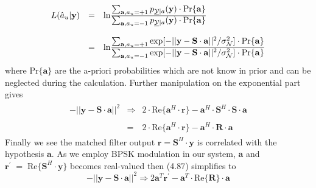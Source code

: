 \begin{eqnarray}
\begin{array}{lll}
L(\hat{a}_u\vert \mathrm{\mathbf{y}})&=&
\mathrm{ln}
\frac
{\hbox{$\sum_{\mathrm{\mathbf{a}},a_u=+1}p_{\underline{\mathcal{Y}}\vert a}(\mathrm{\mathbf{y}})\cdot \mathrm{Pr}\{\mathrm{\mathbf{a}}\}$}}
{\hbox{$\sum_{\mathrm{\mathbf{a}},a_u=-1}p_{\underline{\mathcal{Y}}\vert a}(\mathrm{\mathbf{y}})\cdot \mathrm{Pr}\{\mathrm{\mathbf{a}}\}$}} \\ \\
&=&
\mathrm{ln}
\frac
{\hbox{$\sum_{\mathrm{\mathbf{a}},a_u=+1}\mathrm{exp}[-\vert\vert \mathrm{\mathbf{y}}-\mathrm{\mathbf{S}}\cdot \mathrm{\mathbf{a}}\vert \vert ^2 / \sigma^2_{\mathcal{N}}]\cdot \mathrm{Pr}\{\mathrm{\mathbf{a}}\}$}}
{\hbox{$\sum_{\mathrm{\mathbf{a}},a_u=-1}\mathrm{exp}[-\vert\vert \mathrm{\mathbf{y}}-\mathrm{\mathbf{S}}\cdot \mathrm{\mathbf{a}}\vert \vert ^2 / \sigma^2_{\mathcal{N}}]\cdot \mathrm{Pr}\{\mathrm{\mathbf{a}}\}$}}
\end{array}
\end{eqnarray}
where $\mathrm{Pr}\{\mathrm{\mathbf{a}}\}$ are the a-priori probabilities which are not know in prior and can be neglected during the calculation. Further manipulation on the exponential part gives 
\begin{eqnarray}
\begin{array}{lll}
-\vert\vert\mathrm{\mathbf{y}}-\mathrm{\mathbf{S}}\cdot\mathrm{\mathbf{a}}\vert\vert ^2&\Rightarrow&2\cdot \mathrm{Re}\{\mathrm{\mathbf{a}}^H\cdot\mathrm{\mathbf{r}}\}-\mathrm{\mathbf{a}}^H \cdot \mathrm{\mathbf{S}}^H\cdot\mathrm{\mathbf{S}}\cdot \mathrm{\mathbf{a}} \\ \\
&=&2\cdot \mathrm{Re}\{\mathrm{\mathbf{a}}^H\cdot\mathrm{\mathbf{r}}\}-\mathrm{\mathbf{a}}^H \cdot \mathrm{\mathbf{R}}\cdot \mathrm{\mathbf{a}}
\end{array}
\end{eqnarray}
Finally we see the matched filter output $\mathrm{\mathbf{r}}=\mathrm{\mathbf{S}}^H\cdot\mathrm{\mathbf{y}}$ is correlated with the hypothesis $\mathrm{\mathbf{a}}$. As we employ BPSK modulation in our system, $\mathrm{\mathbf{a}}$ and $\mathrm{\mathbf{r}}^{'}\;=\;\mathrm{Re}\{\mathrm{\mathbf{S}}^H\cdot \mathrm{\mathbf{y}}\}$ becomes real-valued then (4.87) simplifies to
\begin{equation}
-\vert\vert\mathrm{\mathbf{y}}-\mathrm{\mathbf{S}}\cdot\mathrm{\mathbf{a}}\vert\vert ^2 \Longrightarrow 2\mathrm{\mathbf{a}}^T\mathrm{\mathbf{r}}^{'}-\mathrm{\mathbf{a}}^T\cdot \mathrm{Re}\{\mathrm{\mathbf{R}}\}\cdot \mathrm{\mathbf{a}}
\end{equation}
